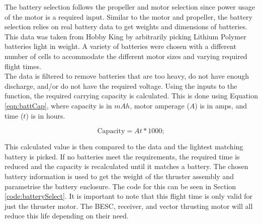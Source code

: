 \documentclass[../main.tex]{subfiles}
\begin{document}
The battery selection follows the propeller and motor selection since power usage of the motor is a required input. Similar to the motor and propeller, the battery selection relies on real battery data to get weights and dimensions of batteries. This data was taken from Hobby King \cite{Hobbyking}  by arbitrarily picking Lithium Polymer batteries light in weight. A variety of batteries were chosen with a different number of cells to accommodate the different motor sizes and varying required flight times.\\

The data is filtered to remove batteries that are too heavy, do not have enough discharge, and/or do not have the required voltage. Using the inputs to the function, the required carrying capacity is calculated. This is done using Equation \ref{eqn:battCap}, where capacity is in $mAh$, motor amperage ($A$) is in amps, and time ($t$) is in hours.

\begin{equation} \label{eqn:battCap}
\text{Capacity} = At*1000;
\end{equation}

This calculated value is then compared to the data and the lightest matching battery is picked. If no batteries meet the requirements, the required time is reduced and the capacity is recalculated until it matches a battery. The chosen battery information is used to get the weight of the thruster assembly and parametrise the battery enclosure. The code for this can be seen in Section \ref{code:batterySelect}. It is important to note that this flight time is only valid for just the thruster motor. The BESC, receiver, and vector thrusting motor will all reduce this life depending on their need.
\end{document}
